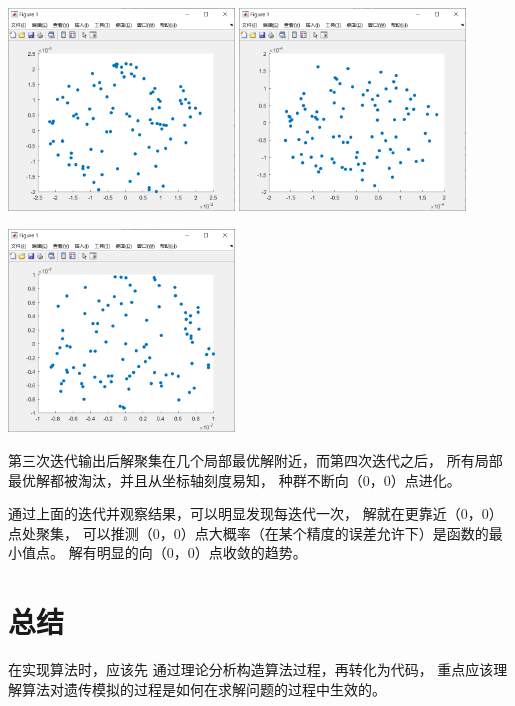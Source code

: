 \documentclass[UTF8]{ctexart}
\begin{document}
\includegraphics[width = 0.45\textwidth]{test2_05.png}
\includegraphics[width = 0.45\textwidth]{test2_06.png}

\includegraphics[width = 0.45\textwidth]{test2_07.png}

第三次迭代输出后解聚集在几个局部最优解附近，而第四次迭代之后，
所有局部最优解都被淘汰，并且从坐标轴刻度易知，
种群不断向（0，0）点进化。

通过上面的迭代并观察结果，可以明显发现每迭代一次，
解就在更靠近（0，0）点处聚集，
可以推测（0，0）点大概率（在某个精度的误差允许下）是函数的最小值点。
解有明显的向（0，0）点收敛的趋势。

\section{总结}

在实现算法时，应该先
通过理论分析构造算法过程，再转化为代码，
重点应该理解算法对遗传模拟的过程是如何在求解问题的过程中生效的。
\end{document}
